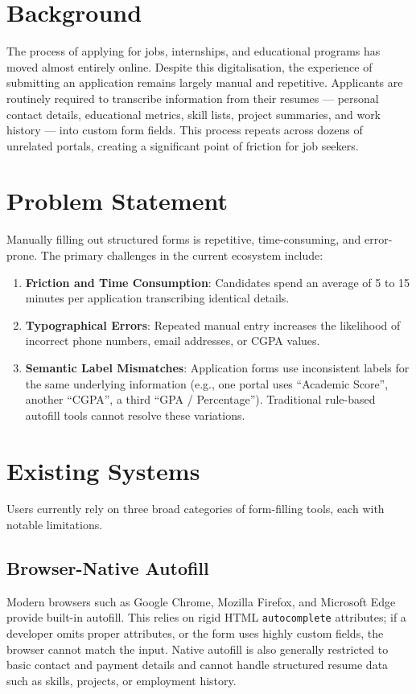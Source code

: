 \documentclass[12pt,a4paper]{report}
\begin{document}
\section{Background}
The process of applying for jobs, internships, and educational programs has moved almost entirely online. Despite this digitalisation, the experience of submitting an application remains largely manual and repetitive. Applicants are routinely required to transcribe information from their resumes — personal contact details, educational metrics, skill lists, project summaries, and work history — into custom form fields. This process repeats across dozens of unrelated portals, creating a significant point of friction for job seekers.

\section{Problem Statement}
Manually filling out structured forms is repetitive, time-consuming, and error-prone. The primary challenges in the current ecosystem include:
\begin{enumerate}
    \item \textbf{Friction and Time Consumption}: Candidates spend an average of 5 to 15 minutes per application transcribing identical details.
    \item \textbf{Typographical Errors}: Repeated manual entry increases the likelihood of incorrect phone numbers, email addresses, or CGPA values.
    \item \textbf{Semantic Label Mismatches}: Application forms use inconsistent labels for the same underlying information (e.g., one portal uses ``Academic Score'', another ``CGPA'', a third ``GPA / Percentage''). Traditional rule-based autofill tools cannot resolve these variations.
\end{enumerate}

\section{Existing Systems}
Users currently rely on three broad categories of form-filling tools, each with notable limitations.

\subsection{Browser-Native Autofill}
Modern browsers such as Google Chrome, Mozilla Firefox, and Microsoft Edge provide built-in autofill. This relies on rigid HTML \texttt{autocomplete} attributes; if a developer omits proper attributes, or the form uses highly custom fields, the browser cannot match the input. Native autofill is also generally restricted to basic contact and payment details and cannot handle structured resume data such as skills, projects, or employment history.
\end{document}

